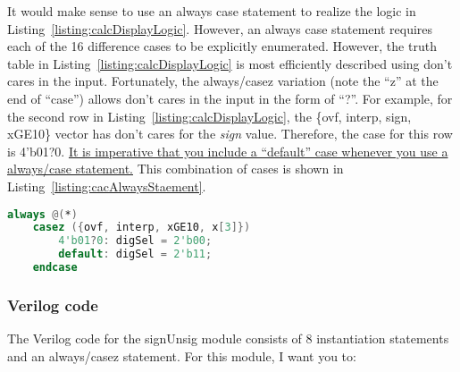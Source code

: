 It would make sense to use an always case statement to realize the logic
in Listing~\ref{listing:calcDisplayLogic}. However, an always case statement requires each of the 16
difference cases to be explicitly enumerated. However, the truth table
in Listing~\ref{listing:calcDisplayLogic} is most efficiently described using don't cares in the
input. Fortunately, the always/casez variation (note the ``z'' at the
end of ``case'') allows don't cares in the input in the form of ``?''.
For example, for the second row in Listing~\ref{listing:calcDisplayLogic}, the \{ovf, interp, sign,
xGE10\} vector has don't cares for the \emph{sign} value. Therefore, the
case for this row is 4'b01?0. \uline{It is imperative that you include a
``default'' case whenever you use a always/case statement.} This
combination of cases is shown in Listing~\ref{listing:cacAlwaysStaement}.


\begin{lstlisting}[language=Verilog,
 caption={The always/casez statement allows don't cares in the input.},
 label={listing:cacAlwaysStaement},
 frame=single]
 always @(*)
    casez ({ovf, interp, xGE10, x[3]})
        4'b01?0: digSel = 2'b00;
        default: digSel = 2'b11;
    endcase

 \end{lstlisting}

\subsubsection{ Verilog code}
\protect\hypertarget{sigUnsign_Verilog}{}{}
The Verilog code for the
signUnsig module consists of 8 instantiation statements and an
always/casez statement. For this module, I want you to:

